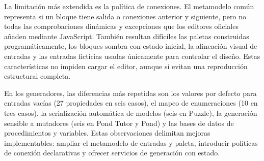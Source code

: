 \begin{table}[htbp]
  \centering
  \caption{Capacidades del editor que explican las diferencias principales}
  \label{tab:limites-editor}
\end{table}

La limitación más extendida es la política de conexiones. El metamodelo común
representa si un bloque tiene salida o conexiones anterior y siguiente, pero no
todas las comprobaciones dinámicas y excepciones que los editores oficiales
añaden mediante JavaScript. También resultan difíciles las paletas construidas
programáticamente, los bloques sombra con estado inicial, la alineación visual
de entradas y las entradas ficticias usadas únicamente para controlar el
diseño. Estas características no impiden cargar el editor, aunque sí evitan una
reproducción estructural completa.

En los generadores, las diferencias más repetidas son los valores por defecto
para entradas vacías (27 propiedades en seis casos), el mapeo de enumeraciones
(10 en tres casos), la serialización automática de modelos (seis en Puzzle), la
generación sensible a mutadores (seis en Pond Tutor y Pond) y las bases de datos
de procedimientos y variables. Estas observaciones delimitan mejoras
implementables: ampliar el metamodelo de entradas y paleta, introducir políticas
de conexión declarativas y ofrecer servicios de generación con estado.

